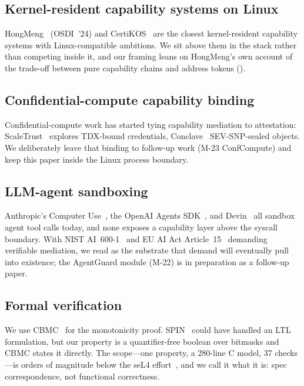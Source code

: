 \subsection{Kernel-resident capability systems on Linux}

HongMeng~\cite{hongmeng} (OSDI~'24) and CertiKOS~\cite{certikos} are
the closest kernel-resident capability systems with Linux-compatible
ambitions. We sit above them in the stack rather than competing
inside it, and our framing leans on HongMeng's own account of the
trade-off between pure capability chains and address tokens
().

\subsection{Confidential-compute capability binding}

Confidential-compute work has started tying capability mediation to
attestation: ScaleTrust~\cite{scaletrust} explores TDX-bound
credentials, Conclave~\cite{conclave} SEV-SNP-sealed objects. We
deliberately leave that binding to follow-up work (M-23 ConfCompute)
and keep this paper inside the Linux process boundary.

\subsection{LLM-agent sandboxing}

Anthropic's Computer Use~\cite{anthropic-cu}, the OpenAI Agents
SDK~\cite{openai-agents}, and Devin~\cite{devin} all sandbox agent
tool calls today, and none exposes a capability layer above the
syscall boundary. With NIST AI~600-1~\cite{nist-ai-600-1} and EU AI
Act Article~15~\cite{euaiact15} demanding verifiable mediation, we
read \sysname as the substrate that demand will eventually pull into
existence; the AgentGuard module (M-22) is in preparation as a
follow-up paper.

\subsection{Formal verification}

We use CBMC~\cite{cbmc} for the monotonicity proof.
SPIN~\cite{spin} could have handled an LTL formulation, but our
property is a quantifier-free boolean over bitmasks and CBMC states
it directly. The scope---one property, a 280-line C model, 37
checks---is orders of magnitude below the seL4
effort~\cite{klein2009sel4}, and we call it what it is:
spec correspondence, not functional correctness.
